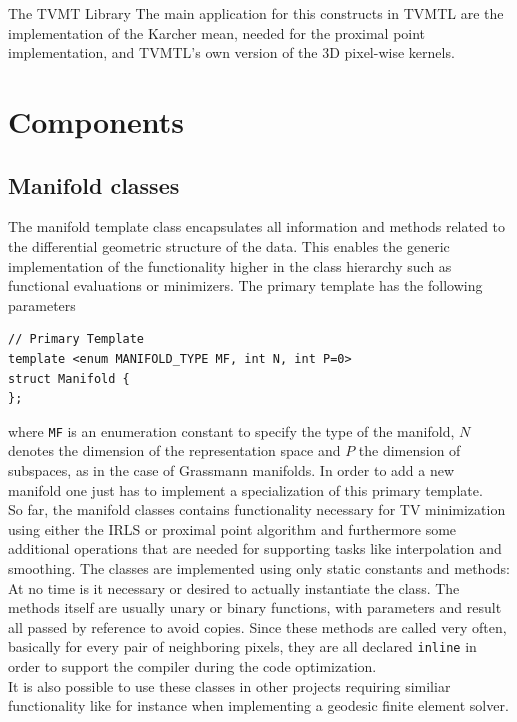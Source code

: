 \begin{chapter}{The TVMT Library}
The main application for this constructs in TVMTL are the implementation of the Karcher mean, needed for the proximal point implementation, and TVMTL's own version
of the 3D pixel-wise kernels.


\section{Components} %
\label{sec:Components}

\subsection{Manifold classes} %
\label{sub:Manifold classes}
The manifold template class encapsulates all information and methods related to the differential geometric structure of the data. 
This enables the generic implementation of the functionality higher in the class hierarchy such as functional evaluations or minimizers.
The primary template has the following parameters
\cppinline
\begin{lstlisting}
// Primary Template
template <enum MANIFOLD_TYPE MF, int N, int P=0>
struct Manifold {
}; 
\end{lstlisting}
where \texttt{MF} is an enumeration constant to specify the type of the manifold, $N$ denotes the dimension of the representation space and $P$ the dimension of subspaces,
as in the case of Grassmann manifolds. In order to add a new manifold one just has to implement a specialization of this primary template.\\

So far, the manifold classes contains functionality necessary for TV minimization using either the IRLS or proximal point algorithm and furthermore some additional operations
that are needed for supporting tasks like interpolation and smoothing. The classes are implemented using only static constants and methods: At no time is it necessary or 
desired to actually instantiate the class. The methods itself are usually unary or binary functions, with parameters and result all passed by reference to avoid copies.
Since these methods are called very often, basically for every pair of neighboring pixels, they are all declared \texttt{inline} in order to support the compiler during 
the code optimization.\\

It is also possible to use these classes in other projects requiring similiar functionality like 
for instance when implementing a geodesic finite element solver.\\


\end{chapter}
